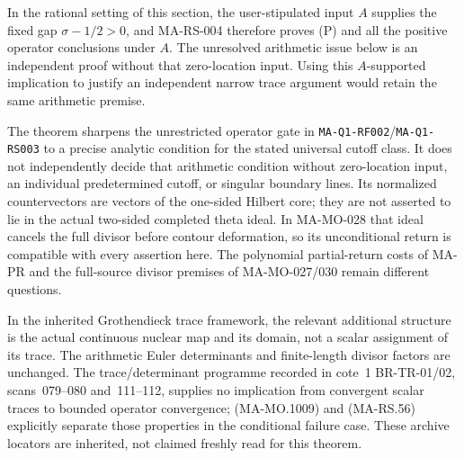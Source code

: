 In the rational setting of this section, the
user-stipulated input \(A\) supplies the fixed
gap \(\sigma-1/2>0\), and MA-RS-004 therefore
proves (P) and all the positive operator
conclusions under \(A\).  The unresolved
arithmetic issue below is an independent
proof without that zero-location input.
Using this \(A\)-supported implication to
justify an independent narrow trace argument
would retain the same arithmetic premise.

The theorem sharpens the unrestricted operator
gate in \texttt{MA-Q1-RF002}/\texttt{MA-Q1-RS003}
to a precise analytic condition for the stated
universal cutoff class.  It does not independently
decide that arithmetic condition without
zero-location input, an individual
predetermined cutoff, or singular boundary
lines.  Its normalized countervectors are
vectors of the one-sided Hilbert core; they
are not asserted to lie in the actual
two-sided completed theta ideal.  In
MA-MO-028 that ideal cancels the full divisor
before contour deformation, so its
unconditional return is compatible with
every assertion here.  The polynomial
partial-return costs of MA-PR and the
full-source divisor premises of
MA-MO-027/030 remain different questions.

In the inherited Grothendieck trace framework,
the relevant additional structure is the
actual continuous nuclear map and its
domain, not a scalar assignment of its
trace.  The arithmetic Euler determinants
and finite-length divisor factors are
unchanged.  The trace/determinant programme
recorded in cote~1 BR-TR-01/02, scans~079--080
and~111--112, supplies no implication from
convergent scalar traces to bounded
operator convergence; (MA-MO.1009) and
(MA-RS.56) explicitly separate those
properties in the conditional failure
case.  These archive locators are inherited,
not claimed freshly read for this theorem.
